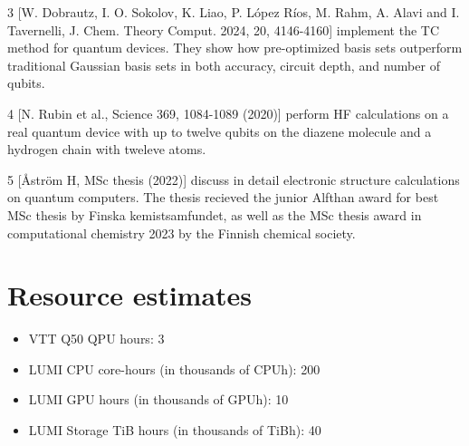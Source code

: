\documentclass[english,a4paper,12pt]{article}
\begin{document}
3 [W. Dobrautz, I. O. Sokolov, K. Liao, P. López Ríos, M. Rahm, A. Alavi and I. Tavernelli, J. Chem. Theory Comput. 2024, 20, 4146-4160] implement the TC method for quantum devices. They show how pre-optimized basis sets outperform traditional Gaussian basis sets in both accuracy, circuit depth, and number of qubits.

4 [N. Rubin et al., Science 369, 1084-1089 (2020)] perform HF calculations on a real quantum device with up to twelve qubits on the diazene molecule and a hydrogen chain with tweleve atoms.

5 [Åström H, MSc thesis (2022)] discuss in detail electronic structure calculations on quantum computers. The thesis recieved the junior Alfthan award for best MSc thesis by Finska kemistsamfundet, as well as the MSc thesis award in computational chemistry 2023 by the Finnish chemical society.


\section{Resource estimates}

\begin{itemize}

\item VTT Q50 QPU hours: 3 

\item LUMI CPU core-hours (in thousands of CPUh): 200

\item LUMI GPU hours (in thousands of GPUh): 10

\item LUMI Storage TiB hours (in thousands of TiBh): 40
\end{itemize}
\end{document}
